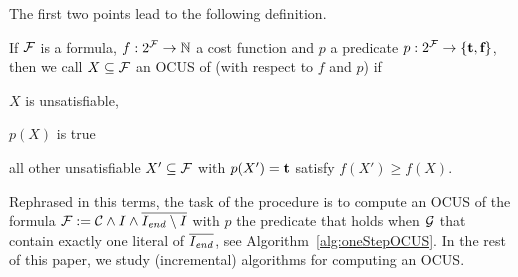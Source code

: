 The first two points lead to the following definition. 


\begin{definition}
    If $\mathcal{F} $ is a formula, $f:2^{\mathcal{F} } \to \mathbb{N}$ a cost function and  $p$ a predicate $p: 2^{\mathcal{F} }\to \{\textbf{t},\textbf{f}\}$, then we call %
    $X \subseteq \mathcal{F} $ an OCUS of \formula (with respect to $f$ and $p$) if \begin{compactitem}                                      
      \item $X$ is unsatisfiable,
      \item $p(X)$ is true
      \item all other unsatisfiable $X'\subseteq \mathcal{F} $ with $p(X')=\textbf{t}$ satisfy $f(X')\geq f(X)$.
    \end{compactitem}
\end{definition}

Rephrased in this terms, the task of the procedure \onestep is to compute an OCUS of the formula $\mathcal{F}  := \mathcal{C} \land I\land \overline{I_\mathit{end} \setminus I}$ with $p$ the predicate that holds when $\mathcal{G} $ that contain exactly one literal of $\overline{I_\mathit{end} }$, see Algorithm~\eqref{alg:oneStepOCUS}. 
In the rest of this paper, we study (incremental) algorithms for computing an OCUS. 




